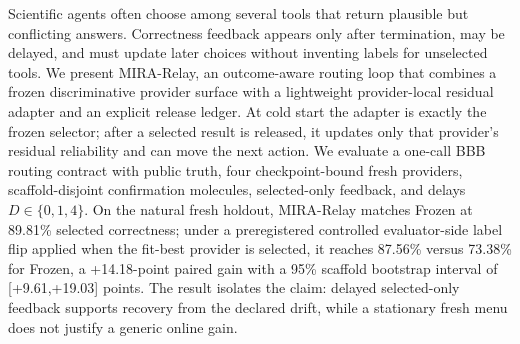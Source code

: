Scientific agents often choose among several tools that return plausible but conflicting answers. Correctness feedback appears only after termination, may be delayed, and must update later choices without inventing labels for unselected tools. We present MIRA-Relay, an outcome-aware routing loop that combines a frozen discriminative provider surface with a lightweight provider-local residual adapter and an explicit release ledger. At cold start the adapter is exactly the frozen selector; after a selected result is released, it updates only that provider's residual reliability and can move the next action. We evaluate a one-call BBB routing contract with public truth, four checkpoint-bound fresh providers, scaffold-disjoint confirmation molecules, selected-only feedback, and delays $D\in\{0,1,4\}$. On the natural fresh holdout, MIRA-Relay matches Frozen at 89.81\% selected correctness; under a preregistered controlled evaluator-side label flip applied when the fit-best provider is selected, it reaches 87.56\% versus 73.38\% for Frozen, a +14.18-point paired gain with a 95\% scaffold bootstrap interval of [+9.61,+19.03] points. The result isolates the claim: delayed selected-only feedback supports recovery from the declared drift, while a stationary fresh menu does not justify a generic online gain.
